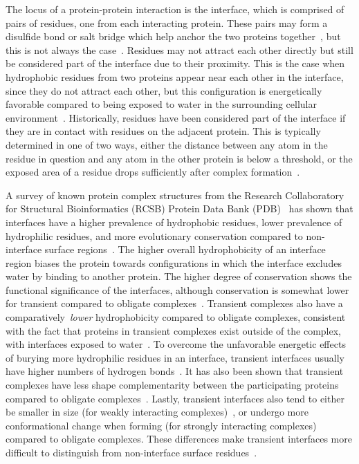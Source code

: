 
The locus of a protein-protein interaction is the interface, which is comprised of pairs of residues, one from each interacting protein.
These pairs may form a disulfide bond or salt bridge which help anchor the two proteins together~\cite{yan2008}, but this is not always the case~\cite{ofran2003}.
Residues may not attract each other directly but still be considered part of the interface due to their proximity.
This is the case when hydrophobic residues from two proteins appear near each other in the interface, since they do not attract each other, but this configuration is energetically favorable compared to being exposed to water in the surrounding cellular environment~\cite{yan2008, ofran2003}.
Historically, residues have been considered part of the interface if they are in contact with residues on the adjacent protein. 
This is typically determined in one of two ways, either the distance between any atom in the residue in question and any atom in the other protein is below a threshold, or the exposed area of a residue drops sufficiently after complex formation~\cite{yan2008, jones1996, ofran2003, minhas2014}.

A survey of known protein complex structures from the Research Collaboratory for Structural Bioinformatics (RCSB) Protein Data Bank (PDB)~\cite{berman2000} has shown that interfaces have a higher prevalence of hydrophobic residues, lower prevalence of hydrophilic residues, and more evolutionary conservation compared to non-interface surface regions~\cite{yan2008}.
The higher overall hydrophobicity of an interface region biases the protein towards configurations in which the interface excludes water by binding to another protein.
The higher degree of conservation shows the functional significance of the interfaces, although conservation is somewhat lower for transient compared to obligate complexes~\cite{jones1996}.
Transient complexes also have a comparatively~\emph{lower} hydrophobicity compared to obligate complexes, consistent with the fact that proteins in transient complexes exist outside of the complex, with interfaces exposed to water~\cite{jones1996}.
To overcome the unfavorable energetic effects of burying more hydrophilic residues in an interface, transient interfaces usually have higher numbers of hydrogen bonds~\cite{jones1996}.
It has also been shown that transient complexes have less shape complementarity between the participating proteins compared to obligate complexes~\cite{jones1996}.
Lastly, transient interfaces also tend to either be smaller in size (for weakly interacting complexes)~\cite{jones1996, perkins2010}, or undergo more conformational change when forming (for strongly interacting complexes)~\cite{perkins2010} compared to obligate complexes.
These differences make transient interfaces more difficult to distinguish from non-interface surface residues~\cite{perkins2010}.

